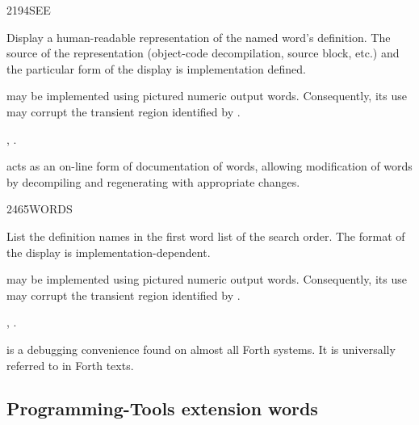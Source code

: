 \begin{worddef}{2194}{SEE}
\item {}

	Display a human-readable representation of the named word's
	definition. The source of the representation (object-code
	decompilation, source block, etc.) and the particular form of
	the display is implementation defined.

	 may be implemented using pictured numeric output
	words. Consequently, its use may corrupt the transient region
	identified by .

\see {},
	.

	\begin{rationale} %
		 acts as an on-line form of documentation of
		words, allowing modification of words by decompiling and
		regenerating with appropriate changes.
	\end{rationale}
\end{worddef}


\begin{worddef}{2465}{WORDS}
\item \stack{}{}

	List the definition names in the first word list of the search
	order. The format of the display is implementation-dependent.

	 may be implemented using pictured numeric output
	words. Consequently, its use may corrupt the transient region
	identified by .

\see {},
	.

	\begin{rationale} %
		 is a debugging convenience found on almost
		all Forth systems. It is universally referred to in Forth texts.
	\end{rationale}
\end{worddef}


\subsection{Programming-Tools extension words} %
\extended


